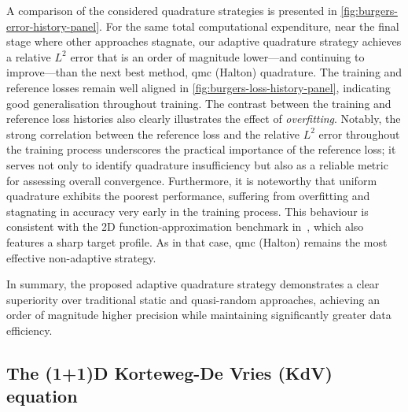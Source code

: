 \documentclass[oneside,reqno,11pt,a4paper]{amsart}
\theoremstyle{definition}
\begin{document}
A comparison of the considered quadrature strategies is presented in
\cref{fig:burgers-error-history-panel}. For the same total computational
expenditure, near the final stage where other approaches stagnate, our adaptive
quadrature strategy achieves a relative $L^2$ error that is an order of
magnitude lower—and continuing to improve—than the next best method, \ac{qmc}
(Halton) quadrature. The training and reference losses remain well aligned in
\cref{fig:burgers-loss-history-panel}, indicating good generalisation
throughout training. The contrast between the training and reference loss
histories also clearly illustrates the effect of \emph{overfitting}.
Notably, the strong correlation between the reference loss and the relative
$L^2$ error throughout the training process underscores the practical
importance of the reference loss; it serves not only to identify quadrature
insufficiency but also as a reliable metric for assessing overall convergence.
Furthermore, it is noteworthy that uniform quadrature exhibits the poorest
performance, suffering from overfitting and stagnating in accuracy very early
in the training process. This behaviour is consistent with the 2D
function-approximation benchmark in~, which also
features a sharp target profile. As in that case, \ac{qmc} (Halton) remains
the most effective non-adaptive strategy.

In summary, the proposed adaptive quadrature strategy demonstrates a clear
superiority over traditional static and quasi-random approaches, achieving an
order of magnitude higher precision while maintaining significantly greater
data efficiency.

\subsection{The (1+1)D Korteweg-De Vries (KdV) equation}
\label{subsec:kdv-problem}
\end{document}
